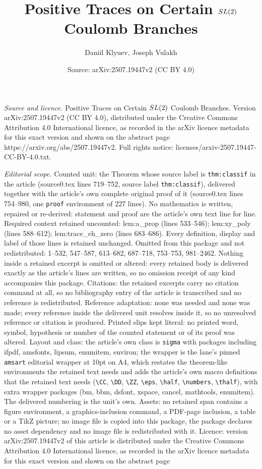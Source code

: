 \documentclass[10pt,a4paper]{amsart}
\title[Positive Traces on Certain ${\rm SL}(2)$ Coulomb Branches]{Positive Traces on Certain ${\rm SL}(2)$ Coulomb Branches}
\author{Daniil Klyuev, Joseph Vulakh}
\date{Source: arXiv:2507.19447v2 (CC BY 4.0)}
\begin{document}
\maketitle

\noindent\emph{Source and licence.} Positive Traces on Certain ${\rm SL}(2)$ Coulomb Branches. Version arXiv:2507.19447v2 (CC BY 4.0), distributed under the Creative Commons Attribution 4.0 International licence, as recorded in the arXiv licence metadata for this exact version and shown on the abstract page https://arxiv.org/abs/2507.19447v2. Full rights notice: licenses/arxiv-2507.19447-CC-BY-4.0.txt.\par\smallskip

\noindent\textit{Editorial scope.} Counted unit: the Theorem whose source label is \texttt{thm:classif} in the article (source0.tex lines 719--752, source label \texttt{thm:classif}), delivered together with the article's own complete original proof of it (source0.tex lines 754--980, one \texttt{proof} environment of 227 lines). No mathematics is written, repaired or re-derived: statement and proof are the article's own text line for line. Required context retained uncounted: lem:a\_prop (lines 533--546); lem:xy\_poly (lines 588--612); lem:trace\_eh\_zero (lines 683--686). Every definition, display and label of those lines is retained unchanged. Omitted from this package and not redistributed: 1--532, 547--587, 613--682, 687--718, 753--753, 981--2462. Nothing inside a retained excerpt is omitted or altered: every retained body is delivered exactly as the article's lines are written, so no omission receipt of any kind accompanies this package. Citations: the retained excerpts carry no citation command at all, so no bibliography entry of the article is transcribed and no reference is redistributed. Reference adaptation: none was needed and none was made; every reference inside the delivered unit resolves inside it, so no unresolved reference or citation is produced. Printed slips kept literal: no printed word, symbol, hypothesis or number of the counted statement or of its proof was altered. Layout and class: the article's own class is \texttt{sigma} with packages including ifpdf, amsfonts, lipsum, enumitem, environ; the wrapper is the lane's pinned \texttt{amsart} editorial wrapper at 10pt on A4, which restates the theorem-like environments the retained text needs and adds the article's own macro definitions that the retained text needs (\texttt{\textbackslash CC}, \texttt{\textbackslash DD}, \texttt{\textbackslash ZZ}, \texttt{\textbackslash eps}, \texttt{\textbackslash half}, \texttt{\textbackslash numbers}, \texttt{\textbackslash thalf}), with extra wrapper packages (bm, bbm, dsfont, xspace, cancel, mathtools, enumitem). The delivered numbering is the unit's own. Assets: no retained span contains a figure environment, a graphics-inclusion command, a PDF-page inclusion, a table or a TikZ picture; no image file is copied into this package, the package declares no asset dependency and no image file is redistributed with it. Licence: version arXiv:2507.19447v2 of this article is distributed under the Creative Commons Attribution 4.0 International licence, as recorded in the arXiv licence metadata for this exact version and shown on the abstract page 
\end{document}
